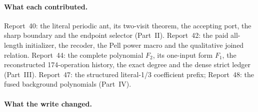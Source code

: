 \documentclass[11pt,letterpaper]{article}
\theoremstyle{definition}\newtheorem{definition}[theorem]{Definition}
\theoremstyle{remark}\newtheorem{remark}[theorem]{Remark}
\begin{document}
\paragraph{What each contributed.} Report~40: the literal periodic ant, its
two-visit theorem, the accepting port, the sharp boundary and the endpoint
selector (Part~II). Report~42: the paid all-length initializer, the recoder,
the Pell power macro and the qualitative joined relation. Report~44: the
complete polynomial $F_2$, its one-input form $F_1$, the reconstructed
174-operation history, the exact degree and the dense strict ledger (Part~III).
Report~47: the structured literal-1/3 coefficient prefix; Report~48: the fused
background polynomials (Part~IV).

\paragraph{What the write changed.}
\end{document}
